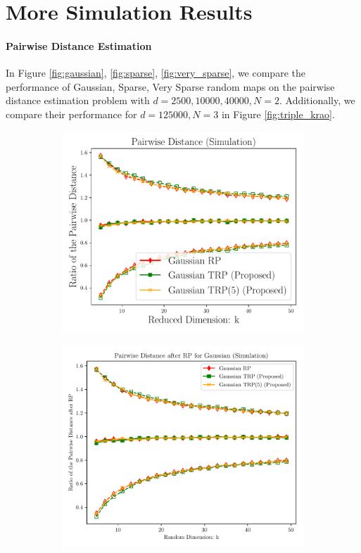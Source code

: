 \section{More Simulation Results}\label{appendix:more_result}

\paragraph{Pairwise Distance Estimation}
In Figure \ref{fig:gaussian}, \ref{fig:sparse}, \ref{fig:very_sparse}, we compare the performance of Gaussian, Sparse, Very Sparse random maps on the pairwise distance estimation problem with $d = 2500, 10000, 40000, N= 2$. Additionally, we compare their performance for $d = 125000, N = 3$ in Figure \ref{fig:triple_krao}.

\begin{figure}[ht!]
	\centering
	\begin{subfigure}{0.32\textwidth}
		\includegraphics[scale = 0.3]{figure/dist_g_d2500.pdf}
	\end{subfigure}
	\begin{subfigure}{0.32\textwidth}
		\includegraphics[scale = 0.3]{figure/dist_g_d10000.pdf}

\end{subfigure}
\end{figure}
